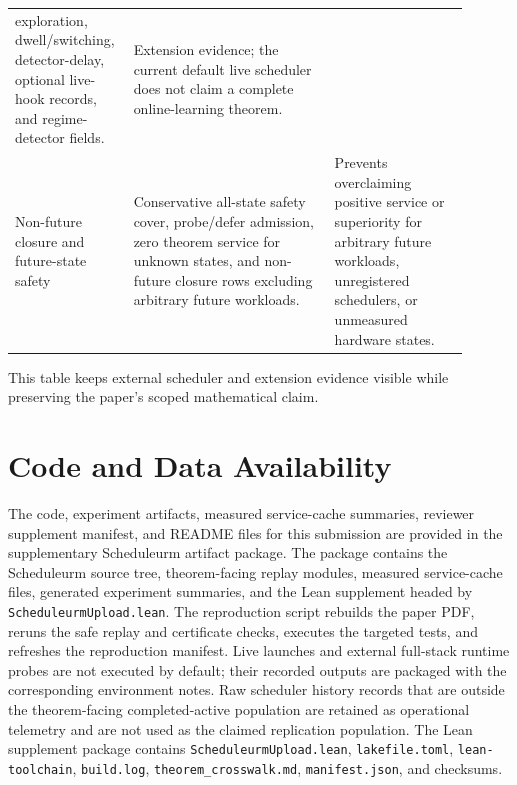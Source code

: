 \documentclass[opre,dblanonrev]{informs4}
\newif\ifECOnly
\begin{document}
\begin{table}[!htbp]
{\begin{tabular}{>{\raggedright\arraybackslash}p{0.20\linewidth}
                >{\raggedright\arraybackslash}p{0.42\linewidth}
                >{\raggedright\arraybackslash}p{0.28\linewidth}}
exploration, dwell/switching, detector-delay, optional live-hook records, and
regime-detector fields. & Extension evidence; the current default live
scheduler does not claim a complete online-learning theorem. \\
Non-future closure and future-state safety & Conservative all-state safety
cover, probe/defer admission, zero theorem service for unknown states, and
non-future closure rows excluding arbitrary future workloads. & Prevents
overclaiming positive service or superiority for arbitrary future workloads,
unregistered schedulers, or unmeasured hardware states. \\
\bottomrule
\end{tabular}
}{This table keeps external scheduler and extension evidence visible while
preserving the paper's scoped mathematical claim.}
\end{table}

\clearpage
\section*{Code and Data Availability}

The code, experiment artifacts, measured service-cache summaries, reviewer
supplement manifest, and README files for this submission are provided in the
supplementary Scheduleurm artifact package.  The package contains the
Scheduleurm source tree, theorem-facing replay modules, measured service-cache
files, generated experiment summaries, and the Lean supplement headed by
\texttt{ScheduleurmUpload.lean}.  The reproduction script rebuilds the paper
PDF, reruns the safe replay and certificate checks, executes the targeted
tests, and refreshes the reproduction manifest.  Live launches and external full-stack
runtime probes are not executed by default; their recorded outputs are packaged
with the corresponding environment notes.  Raw scheduler history records that
are outside the theorem-facing completed-active population are retained as
operational telemetry and are not used as the claimed replication population.
The Lean supplement package contains \texttt{ScheduleurmUpload.lean},
\texttt{lakefile.toml}, \texttt{lean-toolchain}, \texttt{build.log},
\texttt{theorem\_crosswalk.md}, \texttt{manifest.json}, and checksums.

\fi
\ifECOnly\else
\clearpage
\label{page:references-start}


\fi
\end{document}
